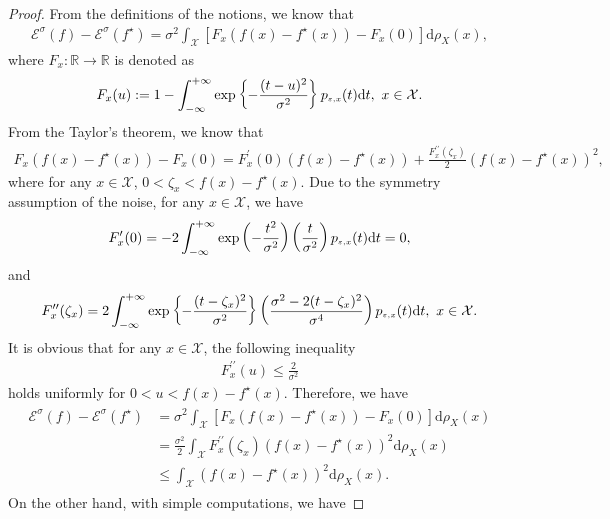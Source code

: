 \documentclass[11pt]{article}
\begin{document}
\begin{proof}
	From the definitions of the notions, we know that
	\begin{align*}
	\mathcal{E}^\sigma(f)-\mathcal{E}^\sigma(f^\star)=  \sigma^2\int_{\mathcal{X}}[F_x(f(x)-f^\star(x))-F_x(0)]\mathrm{d}\rho_X(x),
	\end{align*}
	where $F_x:\mathbb{R}\rightarrow \mathbb{R}$ is denoted as
	\begin{align*}
	F_x(u):=1-\int_{-\infty}^{+\infty}\exp\left\{-\frac{(t-u)^2}{\sigma^2}
	\right\}p_\mathsmaller{\varepsilon,x}(t){\mathrm{d}}t,\,\,x\in\mathcal{X}.
	\end{align*}
	From the Taylor's theorem, we know that
	\begin{align*}
	F_x(f(x)-f^\star(x))-F_x(0)= F_x^\prime(0)(f(x)-f^\star(x))+\frac{F_x^{\prime\prime}(\zeta_x)}{2}(f(x)-f^\star(x))^2,
	\end{align*} 
	where for any $x\in\mathcal{X}$, $0<\zeta_x<f(x)-f^\star(x)$. Due to the symmetry assumption of the noise, for any $x\in\mathcal{X}$, we have
	\begin{align*}
	F_x^\prime(0)=-2\int_{-\infty}^{+\infty}\exp\left(-\frac{t^2}{\sigma^2}
	\right)\left(\frac{t}{\sigma^2}\right)p_\mathsmaller{\varepsilon,x}(t){\mathrm{d}}t=0,
	\end{align*}
	and
	\begin{align*}
	F_x^{\prime\prime}(\zeta_x)=2\int_{-\infty}^{+\infty}\exp\left\{-\frac{(t-\zeta_x)^2}{\sigma^2}
	\right\}\left(\frac{\sigma^2-2(t-\zeta_x)^2}{\sigma^4}\right)p_\mathsmaller{\varepsilon,x}(t){\mathrm{d}}t,\,\,x\in\mathcal{X}.
	\end{align*}
	It is obvious that for any $x\in\mathcal{X}$, the following inequality 
	\begin{align*}
	F_x^{\prime\prime}(u)\leq \frac{2}{\sigma^2}
	\end{align*} 
	holds uniformly for $0<u<f(x)-f^\star(x)$. Therefore, we have
	\begin{align}\label{upper_bound}
	\begin{split}
	\mathcal{E}^\sigma(f)-\mathcal{E}^\sigma(f^\star)&=  \sigma^2\int_{\mathcal{X}}[F_x(f(x)-f^\star(x))-F_x(0)]\mathrm{d}\rho_X(x)\\
	&=\frac{\sigma^2}{2}\int_\mathcal{X}F_x^{\prime\prime}(\zeta_x)(f(x)-f^\star(x))^2\mathrm{d}\rho_X(x)\\
	&\leq \int_{\mathcal{X}}(f(x)-f^\star(x))^2\mathrm{d}\rho_X(x).
	\end{split}
	\end{align}
	On the other hand, with simple computations, we have

\end{proof}
\end{document}
